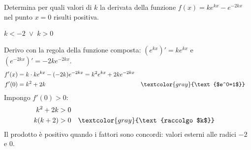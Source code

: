 
\begin{question}[ID=4.1, subtitle={Segno della derivata di $ke^{kx}-e^{-2kx}$ in $x=0$}, tags={derivate, parametrico}, difficulty=media]
Determina per quali valori di $k$ la derivata della funzione $f(x) = ke^{kx} - e^{-2kx}$ nel punto $x=0$ risulti positiva.
\begin{solution}
$k<-2 \;\vee\; k>0$
\end{solution}
\begin{explanation}
Derivo con la regola della funzione composta: $(e^{kx})'=ke^{kx}$ e $(e^{-2kx})'=-2ke^{-2kx}$.
\[\begin{aligned}
f'(x) &= k\cdot ke^{kx}-(-2k)e^{-2kx}=k^2e^{kx}+2ke^{-2kx}\\
f'(0) &= k^2+2k && \textcolor{gray}{\text{$e^0=1$}}
\end{aligned}\]
Impongo $f'(0)>0$:
\[\begin{aligned}
k^2+2k &> 0\\
k(k+2) &> 0 && \textcolor{gray}{\text{raccolgo $k$}}
\end{aligned}\]
Il prodotto è positivo quando i fattori sono concordi: valori esterni alle radici $-2$ e $0$.
\end{explanation}
\end{question}


